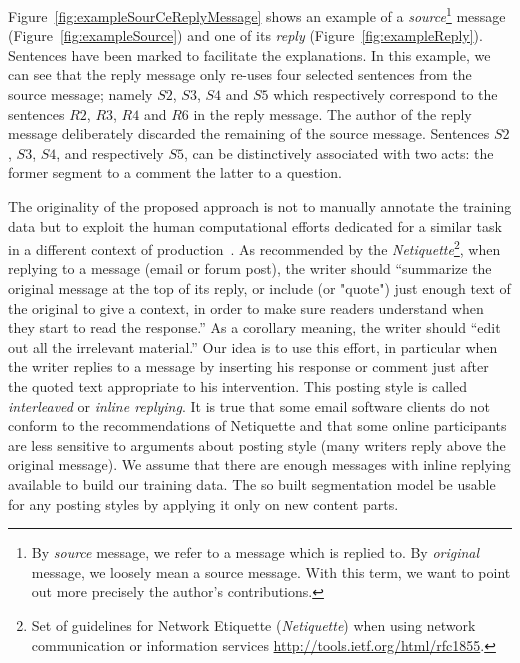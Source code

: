Figure~\ref{fig:exampleSourCeReplyMessage} shows an example of a \textit{source}\footnote{By \textit{source} message, we refer to a message which is replied to. By \textit{original} message, we loosely mean a source message. With this term, we want to point out more precisely the author's contributions.} message (Figure~\ref{fig:exampleSource}) and one of its \textit{reply} (Figure~\ref{fig:exampleReply}).
Sentences have been marked to facilitate the explanations.
In this example, we can see that the reply message only re-uses four selected sentences from the source message; namely $S2$, $S3$, $S4$ and $S5$ which respectively correspond to the sentences  $R2$, $R3$, $R4$ and $R6$ in the reply message.
The author of the reply message deliberately discarded the remaining of the source message.
%
Sentences $S2$, $S3$, $S4$,  and respectively $S5$, can be distinctively associated with two acts: the former segment to a comment the latter to a question.


The originality of the proposed approach is not to manually annotate the training data but to exploit the human computational efforts dedicated for a similar task in a different context of production~\cite{ahn:2006:computer}. 
% 
As recommended by the \textit{Netiquette}\footnote{Set of guidelines for Network Etiquette (\textit{Netiquette}) when using network communication or information services \url{http://tools.ietf.org/html/rfc1855}.}, when replying to a message (email or forum post), the writer should 
 ``summarize the original message at the top of its reply, %
or include (or "quote") just enough text of the original to give a context, in order to make sure readers understand when they start to read the response.''  As a corollary meaning, the writer should ``edit out all the irrelevant material.''
%
Our idea is to use this effort, in particular when the writer replies to a message by inserting his response or comment just after the quoted text appropriate to his intervention. 
%
This posting style is called \textit{interleaved} or \textit{inline replying}.
%
It is true that some email software clients do not conform to the recommendations of Netiquette and that some online participants are less sensitive to arguments about posting style (many writers reply above  the original message).
We assume that there are enough messages with inline replying available to build our training data. 
The so built segmentation model be usable for any posting styles by applying it only on new content parts.

